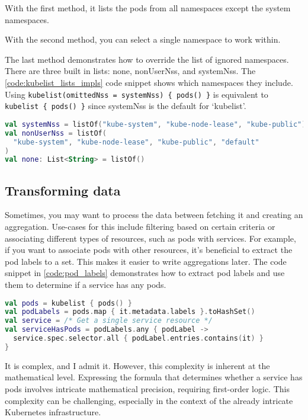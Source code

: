 With the first method, it lists the pods from all namespaces except the system namespaces.

With the second method, you can select a single namespace to work within.

The last method demonstrates how to override the list of ignored namespaces. There are three built in lists: none, nonUserNss, and systemNss. The \ref{code:kubelist_lists_impls} code snippet shows which namespaces they include. Using \lstinline|kubelist(omittedNss = systemNss) { pods() }| is equivalent to \lstinline|kubelist { pods() }| since systemNss is the default for `kubelist'.

\begin{minipage}{\linewidth}
\begin{lstlisting}[caption={Usages of kubelist},language=Kotlin,label=code:kubelist_lists_impls]
val systemNss = listOf("kube-system", "kube-node-lease", "kube-public")
val nonUserNss = listOf(
  "kube-system", "kube-node-lease", "kube-public", "default"
)
val none: List<String> = listOf()
\end{lstlisting}
\end{minipage}

\subsection{Transforming data}

Sometimes, you may want to process the data between fetching it and creating an aggregation. Use-cases for this include filtering based on certain criteria or associating different types of resources, such as pods with services. For example, if you want to associate pods with other resources, it's beneficial to extract the pod labels to a set. This makes it easier to write aggregations later. The code snippet in \ref{code:pod_labels} demonstrates how to extract pod labels and use them to determine if a service has any pods.

\begin{lstlisting}[caption={Extraction of pod labels},language=Kotlin,label=code:pod_labels]
val pods = kubelist { pods() }
val podLabels = pods.map { it.metadata.labels }.toHashSet()
val service = /* Get a single service resource */
val serviceHasPods = podLabels.any { podLabel ->
  service.spec.selector.all { podLabel.entries.contains(it) }
}
\end{lstlisting}

It is complex, and I admit it. However, this complexity is inherent at the mathematical level. Expressing the formula that determines whether a service has pods involves intricate mathematical precision, requiring first-order logic. This complexity can be challenging, especially in the context of the already intricate Kubernetes infrastructure.

